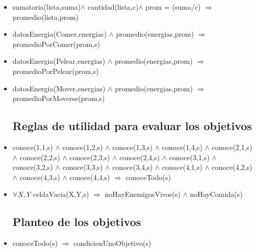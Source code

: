 \begin{itemize}
\item sumatoria(lista,suma)$\land$ cantidad(lista,c)$\land$ prom = (suma/c)
\newline
       $\Rightarrow$ promedio(lista,prom)

\item  datosEnergia(Comer,energias) $\land$ 
 promedio(energias,prom) $\Rightarrow$
 promedioPorComer(prom,s)
       
\item  datosEnergia(Pelear,energias) $\land$ 
 promedio(energias,prom) $\Rightarrow$
 promedioPorPelear(prom,s)

\item  datosEnergia(Mover,energias) $\land$ 
 promedio(energias,prom) $\Rightarrow$
 promedioPorMoverse(prom,s)

\subsection{Reglas de utilidad para evaluar los objetivos}

\item conoce(1,1,s) $\land$ conoce(1,2,s) $\land$ 
 conoce(1,3,s) $\land$ conoce(1,4,s) $\land$ 
 \newline 
 conoce(2,1,s) $\land$ conoce(2,2,s) $\land$ 
 conoce(2,3,s) $\land$ conoce(2,4,s) $\land$ 
 \newline 
 conoce(3,1,s) $\land$ conoce(3,2,s) $\land$ 
 conoce(3,3,s) $\land$ conoce(3,4,s) $\land$ 
 \newline 
 conoce(4,1,s) $\land$ conoce(4,2,s) $\land$ 
 conoce(4,3,s) $\land$ conoce(4,4,s) 
 \newline
 $\Rightarrow$ conoceTodo(s)
 
\item $\forall X,Y$ celdaVacia(X,Y,s) 
 $\Rightarrow$ noHayEnemigosVivos(s) $\land$ noHayComida(s)

\subsection{Planteo de los objetivos}
\item conoceTodo(s) $\Rightarrow$ condicionUnoObjetivo(s)


\end{itemize}

